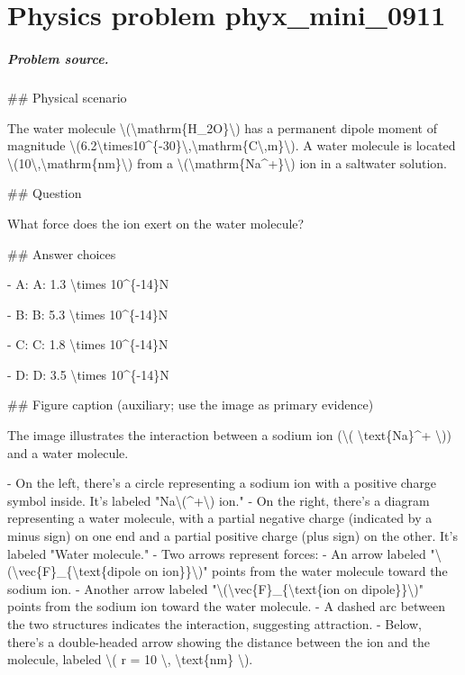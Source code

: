 
\chapter{Physics problem phyx\_mini\_0911}
\label{ch:PhyXMiniProblems_problem_phyx_mini_0911}

\paragraph{Problem source.}
\#\# Physical scenario

The water molecule \textbackslash{}(\textbackslash{}mathrm\{H\_2O\}\textbackslash{}) has a permanent dipole moment of magnitude \textbackslash{}(6.2\textbackslash{}times10\textasciicircum{}\{-30\}\textbackslash{},\textbackslash{}mathrm\{C\textbackslash{},m\}\textbackslash{}). A water molecule is located \textbackslash{}(10\textbackslash{},\textbackslash{}mathrm\{nm\}\textbackslash{}) from a \textbackslash{}(\textbackslash{}mathrm\{Na\textasciicircum{}+\}\textbackslash{}) ion in a saltwater solution.

\#\# Question

What force does the ion exert on the water molecule?

\#\# Answer choices

- A: A: 1.3 \textbackslash{}times 10\textasciicircum{}\{-14\}N

- B: B: 5.3 \textbackslash{}times 10\textasciicircum{}\{-14\}N

- C: C: 1.8 \textbackslash{}times 10\textasciicircum{}\{-14\}N

- D: D: 3.5 \textbackslash{}times 10\textasciicircum{}\{-14\}N

\#\# Figure caption (auxiliary; use the image as primary evidence)

The image illustrates the interaction between a sodium ion (\textbackslash{}( \textbackslash{}text\{Na\}\textasciicircum{}+ \textbackslash{})) and a water molecule. 

- On the left, there's a circle representing a sodium ion with a positive charge symbol inside. It's labeled "Na\textbackslash{}(\textasciicircum{}+\textbackslash{}) ion."
- On the right, there's a diagram representing a water molecule, with a partial negative charge (indicated by a minus sign) on one end and a partial positive charge (plus sign) on the other. It's labeled "Water molecule."
- Two arrows represent forces: 
  - An arrow labeled "\textbackslash{}(\textbackslash{}vec\{F\}\_\{\textbackslash{}text\{dipole on ion\}\}\textbackslash{})" points from the water molecule toward the sodium ion.
  - Another arrow labeled "\textbackslash{}(\textbackslash{}vec\{F\}\_\{\textbackslash{}text\{ion on dipole\}\}\textbackslash{})" points from the sodium ion toward the water molecule.
- A dashed arc between the two structures indicates the interaction, suggesting attraction.
- Below, there's a double-headed arrow showing the distance between the ion and the molecule, labeled \textbackslash{}( r = 10 \textbackslash{}, \textbackslash{}text\{nm\} \textbackslash{}).

